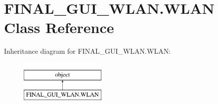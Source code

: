 \hypertarget{class_f_i_n_a_l___g_u_i___w_l_a_n_1_1_w_l_a_n}{}\section{F\+I\+N\+A\+L\+\_\+\+G\+U\+I\+\_\+\+W\+L\+A\+N.\+W\+L\+AN Class Reference}
\label{class_f_i_n_a_l___g_u_i___w_l_a_n_1_1_w_l_a_n}
Inheritance diagram for F\+I\+N\+A\+L\+\_\+\+G\+U\+I\+\_\+\+W\+L\+A\+N.\+W\+L\+AN\+:\begin{figure}[H]
\begin{center}
\leavevmode
\includegraphics[height=2.000000cm]{class_f_i_n_a_l___g_u_i___w_l_a_n_1_1_w_l_a_n}
\end{center}
\end{figure}
